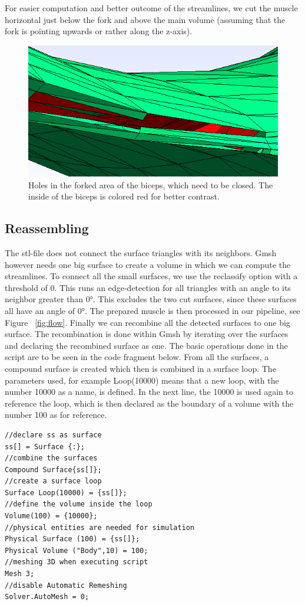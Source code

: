 \documentclass[preprint,journal]{vgtc}       %
\begin{document}
For easier computation and better outcome of the streamlines, we cut the muscle horizontal just below the fork and above the main volume (assuming that the fork is pointing upwards or rather along the z-axis). 

\begin{figure}
	\begin{center}
		\includegraphics[width = .6\linewidth]{holes.png}
	\end{center}
	\caption{Holes in the forked area of the biceps, which need to be closed. The inside of the biceps is colored red for better contrast.}
	\label{fig:holes}
\end{figure}

\subsection{Reassembling}
The stl-file does not connect the surface triangles with its neighbors. 
Gmsh however needs one big surface to create a volume in which we can compute the streamlines. 
To connect all the small surfaces, we use the reclassify option with a threshold of 0.
This runs an edge-detection for all triangles with an angle to its neighbor greater than \ang{0}. 
This excludes the two cut surfaces, since these surfaces all have an angle of \ang{0}. 
The prepared muscle is then processed in our pipeline, see Figure ~\ref{fig:flow}. 
Finally we can recombine all the detected surfaces to one big surface. 
The recombination is done within Gmsh by iterating over the surfaces and declaring the recombined surface as one. 
The basic operations done in the script are to be seen in the code fragment below. 
From all the surfaces, a compound surface is created which then is combined in a surface loop. 
The parameters used, for example Loop(10000) means that a new loop, with the number 10000 as a name, is defined. 
In the next line, the 10000 is used again to reference the loop, which is then declared as the boundary of a volume with the number 100 as for reference. 

\begin{verbatim}
//declare ss as surface
ss[] = Surface {:};
//combine the surfaces
Compound Surface{ss[]};
//create a surface loop
Surface Loop(10000) = {ss[]};
//define the volume inside the loop
Volume(100) = {10000};
//physical entities are needed for simulation
Physical Surface (100) = {ss[]};
Physical Volume ("Body",10) = 100;
//meshing 3D when executing script
Mesh 3;
//disable Automatic Remeshing
Solver.AutoMesh = 0;
\end{verbatim}
\end{document}

